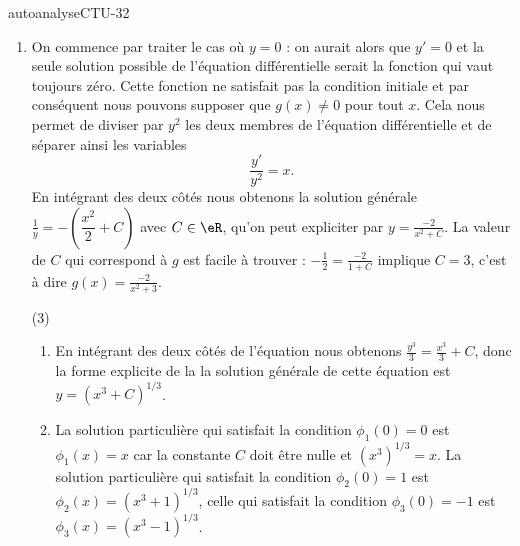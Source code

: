 \begin{corrige}{autoanalyseCTU-32}
\begin{enumerate}
\item On commence par traiter le cas où $y = 0$ : on aurait alors que $y' = 0$ et la seule solution possible de l'équation différentielle serait la fonction qui vaut toujours zéro. Cette fonction ne satisfait pas la condition initiale et par conséquent nous pouvons supposer que $g(x)\neq 0$ pour tout $x$. Cela nous permet de diviser par $y^2$ les deux membres de l'équation différentielle et de séparer ainsi les variables\[
\frac{y'}{y^2} = x. 
\] 
En intégrant des deux c\^otés nous obtenons la solution générale  $\frac{1}{y} =- \left(\dfrac{x^2}{2} + C\right)$ avec $C\in\eR$, qu'on peut expliciter par $y = \frac{-2}{x^2 + C}$. La valeur de $C$ qui correspond à $g$ est facile à trouver : $ -\frac{1}{2} =  \frac{-2}{1 + C}$ implique $C=3$, c'est à dire $g(x) = \frac{-2}{x^2 + 3}$.
\item[(3)]
  \begin{enumerate}
  \item En intégrant des deux c\^otés de l'équation nous obtenons  $\displaystyle \frac{y^3}{3}=\frac{x^3}{3}+C$, donc la forme explicite de la la solution générale de cette équation est $\displaystyle y=\left(x^3+C\right)^{1/3}$.
  \item La solution particulière qui satisfait la condition $\phi_1(0)=0$ est $\phi_1(x)=x$ car la constante $C$ doit \^etre nulle et $\left(x^3\right)^{1/3}=x$.
La solution particulière qui satisfait la condition $\phi_2(0)=1$ est $\phi_2(x)=\left(x^3+1\right)^{1/3}$, celle qui satisfait la condition $\phi_3(0)=-1$ est $\phi_3(x)=\left(x^3-1\right)^{1/3}$. 
  \end{enumerate}
\end{enumerate}


\end{corrige}   
